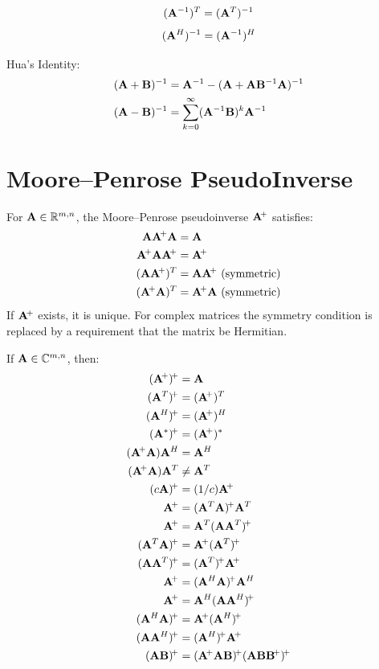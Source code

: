 \begin{equation}
(\mathbf{A}^{-1})^T=(\mathbf{A}^T)^{-1}
\end{equation}
\begin{equation}
(\mathbf{A}^H)^{-1}=(\mathbf{A}^{-1})^H
\end{equation}

Hua's Identity:
\begin{align}
(\mathbf{A}+\mathbf{B})^{-1} &= \mathbf{A}^{-1} - (\mathbf{A}+\mathbf{A}\mathbf{B}^{-1}\mathbf{A})^{-1} \\
(\mathbf{A}-\mathbf{B})^{-1} &= \sum_{k=0}^\infty (\mathbf{A}^{-1}\mathbf{B})^k\mathbf{A}^{-1} \\
\end{align}




\section{Moore--Penrose PseudoInverse}
For $\mathbf{A}\in\mathbb{R}^{m,n}$, the Moore--Penrose pseudoinverse $\mathbf{A}\!^+$ satisfies:
\begin{align}
\mA\mA\pinv\mA      &= \mA                            \\
\mA\pinv\mA\mA\pinv &= \mA\pinv                       \\
(\mA\mA\pinv)^T     &= \mA\mA\pinv\ \textrm{(symmetric)} \\
(\mA\pinv\mA)^T     &= \mA\pinv\mA\ \textrm{(symmetric)}
\end{align}
If $\mathbf{A}\!^+$ exists, it is unique. For complex matrices the symmetry condition is replaced by a requirement that the matrix be Hermitian.

If $\mathbf{A}\in\mathbb{C}^{m,n}$, then:
\begin{align}
(\mA\pinv)\pinv     &=   \mA                  \\
(\mA^T)\pinv        &=   (\mA\pinv)^T         \\
(\mA^H)\pinv        &=   (\mA\pinv)^H         \\
(\mA^*)\pinv        &=   (\mA\pinv)^*         \\
(\mA\pinv\mA)\mA^H  &=   \mA^H                \\
(\mA\pinv\mA)\mA^T  &\ne \mA^T                \\
(c\mA)\pinv         &=   (1/c)\mA\pinv        \\
\mA\pinv            &=   (\mA^T\mA)\pinv\mA^T \\
\mA\pinv            &=   \mA^T(\mA\mA^T)\pinv \\
(\mA^T\mA)\pinv     &=   \mA\pinv(\mA^T)\pinv \\
(\mA\mA^T)\pinv     &=   (\mA^T)\pinv\mA\pinv \\
\mA\pinv            &=   (\mA^H\mA)\pinv\mA^H \\
\mA\pinv            &=   \mA^H(\mA\mA^H)\pinv \\
(\mA^H\mA)\pinv     &=   \mA\pinv(\mA^H)\pinv \\
(\mA\mA^H)\pinv     &=   (\mA^H)\pinv\mA\pinv \\
(\mA\mB)\pinv       &=   (\mA\pinv\mA\mB)\pinv(\mA\mB\mB\pinv)\pinv
\end{align}

